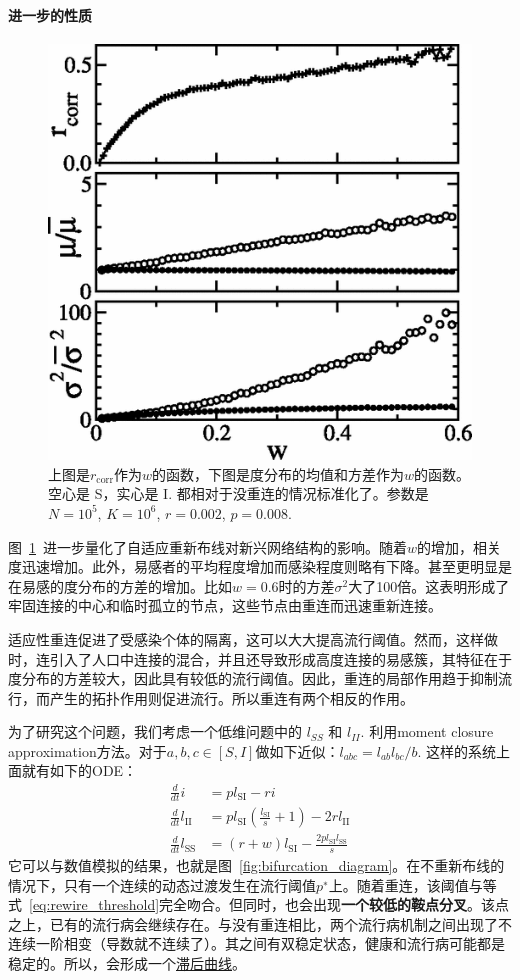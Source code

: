 \paragraph{进一步的性质}
\begin{figure}
    \centering
    \includegraphics[width = 0.5\linewidth]{Pics/Degree_correlation_index.png}
    \caption{上图是$r_\text{corr}$作为$w$的函数，下图是度分布的均值和方差作为$w$的函数。空心是 S，实心是 I. 都相对于没重连的情况标准化了。参数是$N=10^5$, $K = 10^6$, $r = 0.002$, $p = 0.008$.}
    \label{fig:parameters_vs_rewire}
\end{figure}

图~\ref{fig:parameters_vs_rewire}~进一步量化了自适应重新布线对新兴网络结构的影响。随着$w$的增加，相关度迅速增加。此外，易感者的平均程度增加而感染程度则略有下降。甚至更明显是在易感的度分布的方差的增加。比如$w=0.6$时的方差$\sigma^2$大了100倍。这表明形成了牢固连接的中心和临时孤立的节点，这些节点由重连而迅速重新连接。

适应性重连促进了受感染个体的隔离，这可以大大提高流行阈值。然而，这样做时，连引入了人口中连接的混合，并且还导致形成高度连接的易感簇，其特征在于度分布的方差较大，因此具有较低的流行阈值。因此，重连的局部作用趋于抑制流行，而产生的拓扑作用则促进流行。所以重连有两个相反的作用。

为了研究这个问题，我们考虑一个低维问题中的 $l_{SS}$ 和 $l_{II}$. 利用moment closure approximation方法。对于$a,b,c\in[S,I]$做如下近似：$l_{abc} = l_{ab} l_{bc} / b$. 这样的系统上面就有如下的ODE：
\begin{align}
    \frac{d}{d t} i&=p l_{\mathrm{SI}}-r i\\
    \frac{d}{d t} l_{\mathrm{II}}&=p l_{\mathrm{SI}}\left(\frac{l_{\mathrm{SI}}}{s}+1\right)-2 r l_{\mathrm{II}}\\
    \frac{d}{d t} l_{\mathrm{SS}}&=(r+w) l_{\mathrm{SI}}-\frac{2 p l_{\mathrm{SI}} l_{\mathrm{SS}}}{s}
\end{align}
它可以与数值模拟的结果，也就是图~\ref{fig:bifurcation_diagram}。在不重新布线的情况下，只有一个连续的动态过渡发生在流行阈值$p^∗$上。随着重连，该阈值与等式~\ref{eq:rewire_threshold}完全吻合。但同时，也会出现\textbf{一个较低的鞍点分叉}。该点之上，已有的流行病会继续存在。与没有重连相比，两个流行病机制之间出现了不连续一阶相变（导数就不连续了）。其之间有双稳定状态，健康和流行病可能都是稳定的。所以，会形成一个\href{https://baike.baidu.com/item/滞后回线/360581?fr=aladdin}{滞后曲线}。

